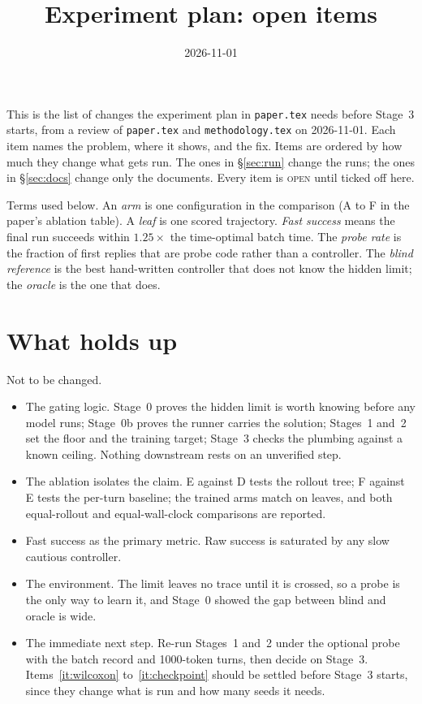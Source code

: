 \documentclass[11pt,a4paper]{article}
\title{\textbf{Experiment plan: open items}}
\author{}
\date{2026-11-01}
\begin{document}
\maketitle

This is the list of changes the experiment plan in \texttt{paper.tex}
needs before Stage~3 starts, from a review of \texttt{paper.tex} and
\texttt{methodology.tex} on 2026-11-01. Each item names the problem, where
it shows, and the fix. Items are ordered by how much they change what gets
run. The ones in \S\ref{sec:run} change the runs; the ones in
\S\ref{sec:docs} change only the documents. Every item is \textsc{open}
until ticked off here.

Terms used below. An \emph{arm} is one configuration in the comparison
(A to F in the paper's ablation table). A \emph{leaf} is one scored
trajectory. \emph{Fast success} means the final run succeeds within
$1.25\times$ the time-optimal batch time. The \emph{probe rate} is the
fraction of first replies that are probe code rather than a controller.
The \emph{blind reference} is the best hand-written controller that does
not know the hidden limit; the \emph{oracle} is the one that does.

\section{What holds up}

Not to be changed.
\begin{itemize}[leftmargin=1.5em]
  \item The gating logic. Stage~0 proves the hidden limit is worth knowing
  before any model runs; Stage~0b proves the runner carries the solution;
  Stages~1 and~2 set the floor and the training target; Stage~3 checks the
  plumbing against a known ceiling. Nothing downstream rests on an
  unverified step.
  \item The ablation isolates the claim. E against D tests the rollout
  tree; F against E tests the per-turn baseline; the trained arms match on
  leaves, and both equal-rollout and equal-wall-clock comparisons are
  reported.
  \item Fast success as the primary metric. Raw success is saturated by any
  slow cautious controller.
  \item The environment. The limit leaves no trace until it is crossed, so a
  probe is the only way to learn it, and Stage~0 showed the gap between
  blind and oracle is wide.
  \item The immediate next step. Re-run Stages~1 and~2 under the optional
  probe with the batch record and 1000-token turns, then decide on
  Stage~3. Items~\ref{it:wilcoxon} to~\ref{it:checkpoint} should be settled
  before Stage~3 starts, since they change what is run and how many seeds
  it needs.
\end{itemize}
\end{document}

